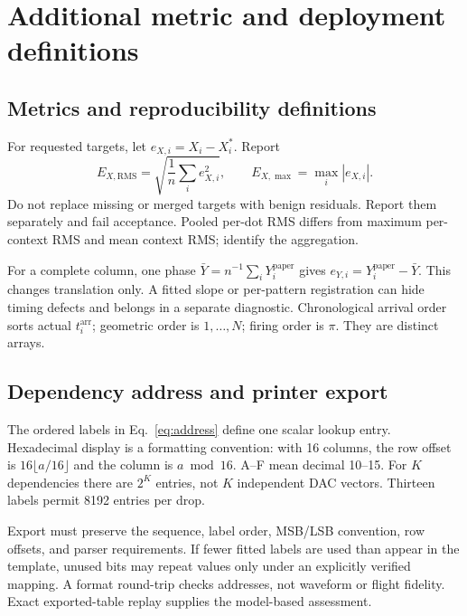 \section{Additional metric and deployment definitions}
\subsection{Metrics and reproducibility definitions}
For requested targets, let $e_{X,i}=X_i-X_i^*$. Report
\begin{equation}
 E_{X,\mathrm{RMS}}=\sqrt{\frac{1}{n}\sum_ie_{X,i}^2},\qquad
 E_{X,\max}=\max_i|e_{X,i}|.
\end{equation}
Do not replace missing or merged targets with benign residuals. Report them separately and fail acceptance. Pooled per-dot RMS differs from maximum per-context RMS and mean context RMS; identify the aggregation.

For a complete column, one phase $\bar Y=n^{-1}\sum_iY_i^{\mathrm{paper}}$ gives $e_{Y,i}=Y_i^{\mathrm{paper}}-\bar Y$. This changes translation only. A fitted slope or per-pattern registration can hide timing defects and belongs in a separate diagnostic. Chronological arrival order sorts actual $t_i^{\mathrm{arr}}$; geometric order is $1,\ldots,N$; firing order is $\pi$. They are distinct arrays.

\subsection{Dependency address and printer export}
The ordered labels in Eq.~\eqref{eq:address} define one scalar lookup entry. Hexadecimal display is a formatting convention: with 16 columns, the row offset is $16\lfloor a/16\rfloor$ and the column is $a\bmod16$. A--F mean decimal 10--15. For $K$ dependencies there are $2^K$ entries, not $K$ independent DAC vectors. Thirteen labels permit 8192 entries per drop.

Export must preserve the sequence, label order, MSB/LSB convention, row offsets, and parser requirements. If fewer fitted labels are used than appear in the template, unused bits may repeat values only under an explicitly verified mapping. A format round-trip checks addresses, not waveform or flight fidelity. Exact exported-table replay supplies the model-based assessment.

